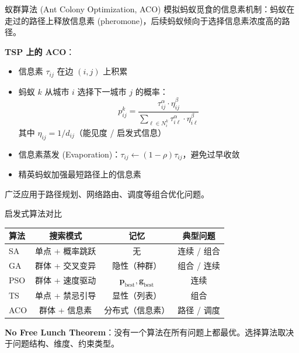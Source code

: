 \documentclass[11pt, aspectratio=169, svgnames, table, fontset=fandol]{ctexbeamer}
\begin{document}
\begin{frame}{蚁群算法 (Ant Colony Optimization, ACO)}
  模拟蚂蚁觅食的信息素机制：蚂蚁在走过的路径上释放信息素 (pheromone)，后续蚂蚁倾向于选择信息素浓度高的路径。

  \vspace{6pt}
  \textbf{TSP 上的 ACO}：
  \begin{itemize}
    \item 信息素 $\tau_{ij}$ 在边 $(i,j)$ 上积累
    \item 蚂蚁 $k$ 从城市 $i$ 选择下一城市 $j$ 的概率：
      \begin{equation*}
        p_{ij}^k = \frac{\tau_{ij}^\alpha \cdot \eta_{ij}^\beta}{\sum_{\ell \in N_i^k} \tau_{i\ell}^\alpha \cdot \eta_{i\ell}^\beta}
      \end{equation*}
      其中 $\eta_{ij} = 1/d_{ij}$（能见度 / 启发式信息）
    \item 信息素蒸发 (Evaporation)：$\tau_{ij} \leftarrow (1-\rho)\tau_{ij}$，避免过早收敛
    \item 精英蚂蚁加强最短路径上的信息素
  \end{itemize}

  广泛应用于路径规划、网络路由、调度等组合优化问题。
\end{frame}

\begin{frame}{启发式算法对比}
  \begin{table}
    \small
    \begin{tabular}{l|c|c|c}
      \toprule
      算法 & 搜索模式 & 记忆 & 典型问题 \\
      \midrule
      SA & 单点 + 概率跳跃 & 无 & 连续 / 组合 \\
      GA & 群体 + 交叉变异 & 隐性（种群） & 组合 / 连续 \\
      PSO & 群体 + 速度驱动 & $\bm{p}_{\text{best}}, \bm{g}_{\text{best}}$ & 连续 \\
      TS & 单点 + 禁忌引导 & 显性（列表） & 组合 \\
      ACO & 群体 + 信息素 & 分布式（信息素） & 路径 / 调度 \\
      \bottomrule
    \end{tabular}
  \end{table}

  \vspace{6pt}
  \textbf{No Free Lunch Theorem}：没有一个算法在所有问题上都最优。选择算法取决于问题结构、维度、约束类型。
\end{frame}

\end{document}
